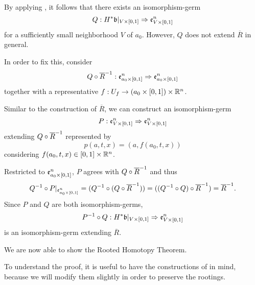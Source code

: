 \begin{myproof}
    By applying ,
    it follows that there exists an isomorphism-germ
    \[ \germdef{Q}{\ind{H}\bb[\cyl{V}]}{\be{\cyl{V}}} \]
    for a sufficiently small neighborhood $V$ of $a_0$.
    However, $Q$ does not extend $\overline{R}$ in general.

    In order to fix this, consider
    \[ Q \circ \overline{R}^{-1}: \mathfrak{e}^{n}_{a_0 \times{} [0, 1]} \Rightarrow{} \mathfrak{e}^{n}_{a_0 \times{} [0, 1]} \]
    together with a representative $f: U_f \to (a_0 \times{} [0, 1]) \times \mathbb{R}^n$.

    Similar to the construction of $\overline{R}$, we can construct an isomorphism-germ
    \[ P: \mathfrak{e}^{n}_{V \times{} [0, 1]} \Rightarrow{} \mathfrak{e}^{n}_{V \times{} [0, 1]} \]
    extending $Q \circ \overline{R}^{-1}$ represented by
    \[ p(a, t, x) = (a, f(a_0, t, x)) \]
    considering $f(a_0, t, x) \in [0, 1] \times \mathbb{R}^n$.

    Restricted to $\mathfrak{e}^{n}_{a_0 \times{} [0, 1]}$, $P$ agrees with $Q \circ \overline{R}^{-1}$ and thus
    \[
        Q^{-1} \circ P\vert_{\mathfrak{e}^{n}_{a_0 \times{} [0, 1]}}
        = (Q^{-1} \circ (Q \circ \overline{R}^{-1}))
        = ((Q^{-1} \circ Q) \circ \overline{R}^{-1})
        = \overline{R}^{-1}.
    \]
    Since $P$ and $Q$ are both isomorphism-germs,
    \[ \germdef{\inv{P} \circ Q}{\ind{H}\bb[\cyl{V}]}{\be{\cyl{V}}} \]
    is an isomorphism-germ extending $\overline{R}$.
\end{myproof}

\begin{myparagraph}
    We are now able to show the Rooted Homotopy Theorem.

    To understand the proof,
    it is useful to have the constructions of  in mind,
    because we will modify them slightly in order to preserve the rootings.
\end{myparagraph}


